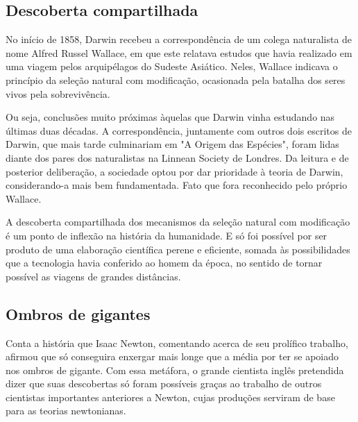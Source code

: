 \documentclass[12pt]{extarticle}
\begin{document}
\subsection{Descoberta compartilhada}

No início de 1858, Darwin recebeu a correspondência de um colega naturalista de
nome Alfred Russel Wallace, em que este relatava estudos que havia realizado em
uma viagem pelos arquipélagos do Sudeste Asiático. Neles, Wallace indicava
o princípio da seleção natural com modificação, ocasionada pela batalha dos
seres vivos pela sobrevivência.

Ou seja, conclusões muito próximas àquelas que Darwin vinha estudando nas
últimas duas décadas. A correspondência, juntamente com outros dois escritos de
Darwin, que mais tarde culminariam em "A Origem das Espécies", foram lidas
diante dos pares dos naturalistas na Linnean Society de Londres. Da leitura
e de posterior deliberação, a sociedade optou por dar prioridade à teoria de
Darwin, considerando-a mais bem fundamentada. Fato que fora reconhecido pelo
próprio Wallace.




A descoberta compartilhada dos mecanismos da seleção natural com modificação
é um ponto de inflexão na história da humanidade. E só foi possível por ser
produto de uma elaboração científica perene e eficiente, somada às
possibilidades que a tecnologia havia conferido ao homem da época, no sentido
de tornar possível as viagens de grandes distâncias.




\subsection{Ombros de gigantes}

Conta a história que Isaac Newton, comentando acerca de seu prolífico trabalho,
afirmou que só conseguira enxergar mais longe que a média por ter se apoiado
nos ombros de gigante. Com essa metáfora, o grande cientista inglês pretendida
dizer que suas descobertas só foram possíveis graças ao trabalho de outros
cientistas importantes anteriores a Newton, cujas produções serviram de base
para as teorias newtonianas.
\end{document}
